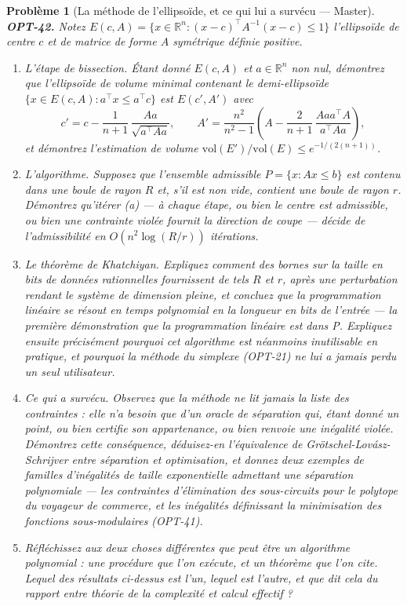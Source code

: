 \documentclass[11pt]{article}
\newtheorem{problem}{Problème}
\begin{document}
\begin{problem}[{La méthode de l'ellipsoïde, et ce qui lui a survécu --- Master}]
\textbf{OPT-42.} Notez $E(c, A) = \{x \in \mathbb{R}^n : (x - c)^{\top}A^{-1}(x - c) \le 1\}$ l'ellipsoïde de centre $c$ et de matrice de forme $A$ symétrique définie positive.
\begin{enumerate}
\item[(a)] L'étape de bissection. Étant donné $E(c,A)$ et $a \in \mathbb{R}^n$ non nul, démontrez que l'ellipsoïde de volume minimal contenant le demi-ellipsoïde $\{x \in E(c,A) : a^{\top}x \le a^{\top}c\}$ est $E(c', A')$ avec
\[ c' = c - \frac{1}{n+1}\,\frac{Aa}{\sqrt{a^{\top}Aa}}, \qquad A' = \frac{n^2}{n^2 - 1}\left( A - \frac{2}{n+1}\,\frac{Aaa^{\top}A}{a^{\top}Aa} \right), \]
et démontrez l'estimation de volume $\mathrm{vol}(E')/\mathrm{vol}(E) \le e^{-1/(2(n+1))}$.
\item[(b)] L'algorithme. Supposez que l'ensemble admissible $P = \{x : Ax \le b\}$ est contenu dans une boule de rayon $R$ et, s'il est non vide, contient une boule de rayon $r$. Démontrez qu'itérer (a) --- à chaque étape, ou bien le centre est admissible, ou bien une contrainte violée fournit la direction de coupe --- décide de l'admissibilité en $O(n^2 \log(R/r))$ itérations.
\item[(c)] Le théorème de Khatchiyan. Expliquez comment des bornes sur la taille en bits de données rationnelles fournissent de tels $R$ et $r$, après une perturbation rendant le système de dimension pleine, et concluez que la programmation linéaire se résout en temps polynomial en la longueur en bits de l'entrée --- la première démonstration que la programmation linéaire est dans P. Expliquez ensuite précisément pourquoi cet algorithme est néanmoins inutilisable en pratique, et pourquoi la méthode du simplexe (OPT-21) ne lui a jamais perdu un seul utilisateur.
\item[(d)] Ce qui a survécu. Observez que la méthode ne lit jamais la liste des contraintes : elle n'a besoin que d'un \textit{oracle de séparation} qui, étant donné un point, ou bien certifie son appartenance, ou bien renvoie une inégalité violée. Démontrez cette conséquence, déduisez-en l'équivalence de Grötschel-Lovász-Schrijver entre séparation et optimisation, et donnez deux exemples de familles d'inégalités de taille exponentielle admettant une séparation polynomiale --- les contraintes d'élimination des sous-circuits pour le polytope du voyageur de commerce, et les inégalités définissant la minimisation des fonctions sous-modulaires (OPT-41).
\item[(e)] Réfléchissez aux deux choses différentes que peut être un algorithme polynomial : une procédure que l'on exécute, et un théorème que l'on cite. Lequel des résultats ci-dessus est l'un, lequel est l'autre, et que dit cela du rapport entre théorie de la complexité et calcul effectif ?
\end{enumerate}

\end{problem}
\end{document}
